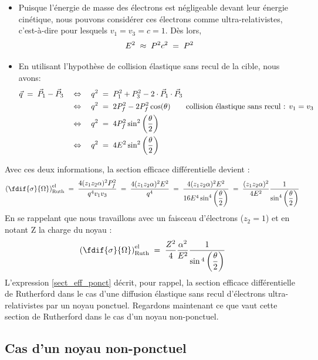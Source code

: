 \begin{itemize}

    \item Puisque l'énergie de masse des électrons est négligeable devant leur énergie cinétique, nous pouvons considérer ces électrons comme ultra-relativistes, c'est-à-dire pour lesquels $v_1=v_3=c=1$. Dès lors,
    \[
        E^2 \;\approx\; P^2c^2 \; = \; P^2
    \]
    
    \item En utilisant l'hypothèse de collision élastique sans recul de la cible, nous avons:
    \begin{align*}
        \vec{q} \; = \; \vec{P}_1 - \vec{P}_3
            &\quad \Leftrightarrow \quad
        q^2 \; = \; P_1^2 + P_3^2 - 2 \cdot \vec{P}_1 \cdot \vec{P}_3\\
            &\quad \Leftrightarrow \quad
        q^2 \; = \; 2 P_f^2 - 2 P_f^2 \cos(\theta)
        \qquad \text{collision élastique sans recul : } v_1=v_3\\
            &\quad \Leftrightarrow \quad
        q^2 \; = \; 4 P_f^2 \sin^2\left(\dfrac{\theta}{2}\right)\\
            &\quad \Leftrightarrow \quad
        q^2 \; = \; 4 E^2   \sin^2\left(\dfrac{\theta}{2}\right)
    \end{align*}
\end{itemize}
Avec ces deux informations, la section efficace différentielle devient :
\[
    \left(  \fdif{\sigma}{\Omega}  \right)^\text{el}_\text{Ruth}
    \eq
    \dfrac{4 (z_1 z_2 \alpha)^2 P_f^2}{q^4v_1v_3}
    \eq
    \dfrac{4 (z_1 z_2 \alpha)^2 E^2}{q^4}
    \eq
    \dfrac{4 (z_1 z_2 \alpha)^2 E^2}{16 E^4 \sin^4\left(\dfrac{\theta}{2}\right)}
    \eq
    \dfrac{(z_1 z_2 \alpha)^2}{4E^2}
    \dfrac{1}{\sin^4\left(\dfrac{\theta}{2}\right)}
\]
En se rappelant que nous travaillons avec un faisceau d'électrons ($z_2 = 1$) et en notant Z la charge du noyau : 
\begin{equation}
    \left(  \fdif{\sigma}{\Omega}  \right)^\text{el}_\text{Ruth}
    \eq
    \dfrac{Z^2}{4}\dfrac{\alpha^2}{E^2}\dfrac{1}{\sin{^4\left(\dfrac{\theta}{2}\right)}}
    \label{sect_eff_ponct}
\end{equation}
L'expression \ref{sect_eff_ponct} décrit, pour rappel, la section efficace différentielle de Rutherford dans le cas d'une diffusion élastique sans recul d'électrons ultra-relativistes par un noyau ponctuel. Regardons maintenant ce que vaut cette section de Rutherford dans le cas d'un noyau non-ponctuel.


\subsection{Cas d'un noyau non-ponctuel}\label{sec:noyau_non_ponctuel}



